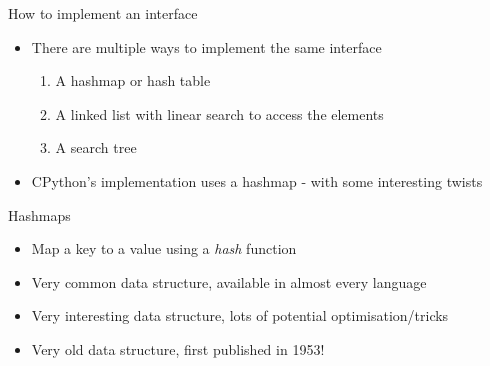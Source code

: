 \documentclass[12pt, aspectration=1610]{beamer}
\begin{document}
    \begin{frame}{How to implement an interface}
        \begin{itemize}
            \item There are multiple ways to implement the same interface
                \begin{enumerate}
                    \item A hashmap or hash table
                    \item A linked list with linear search to access the elements
                    \item A search tree
                \end{enumerate}
            \item CPython's implementation uses a hashmap - with some interesting twists
        \end{itemize}
    \end{frame}

    \begin{frame}{Hashmaps}
        \begin{itemize}
            \item Map a key to a value using a \textit{hash} function
            \item Very common data structure, available in almost every language
            \item Very interesting data structure, lots of potential optimisation/tricks
            \item Very old data structure, first published in 1953!
        \end{itemize}
    \end{frame}
\end{document}
